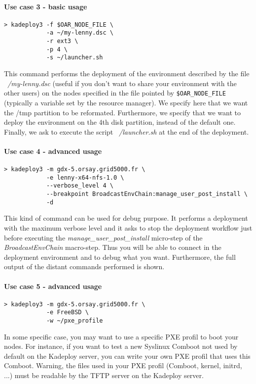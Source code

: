 \documentclass[a4wide,10pt,oneside]{book}
\begin{document}
\paragraph{Use case 3 - basic usage}
\begin{verbatim}
> kadeploy3 -f $OAR_NODE_FILE \
            -a ~/my-lenny.dsc \
            -r ext3 \
            -p 4 \
            -s ~/launcher.sh
\end{verbatim}
This command performs the deployment of the environment described by the file \textit{~/my-lenny.dsc} (useful if you don't want to share your environment with the other users) on the nodes specified in the file pointed by \texttt{\$OAR\_NODE\_FILE} (typically a variable set by the resource manager). We specify here that we want the /tmp partition to be reformated. Furthermore, we specify that we want to deploy the environment on the 4th disk partition, instead of the default one. Finally, we ask to execute the script \textit{~/launcher.sh} at the end of the deployment.

\paragraph{Use case 4 - advanced usage}
\begin{verbatim}
> kadeploy3 -m gdx-5.orsay.grid5000.fr \
            -e lenny-x64-nfs-1.0 \
            --verbose_level 4 \
            --breakpoint BroadcastEnvChain:manage_user_post_install \
            -d
\end{verbatim}
This kind of command can be used for debug purpose. It performs a deployment with the maximum verbose level and it asks to stop the deployment workflow just before executing the \textit{manage\_user\_post\_install} micro-step of the \textit{BroadcastEnvChain} macro-step. Thus you will be able to connect in the deployment environment and to debug what you want. Furthermore, the full output of the distant commands performed is shown.

\paragraph{Use case 5 - advanced usage}
\begin{verbatim}
> kadeploy3 -m gdx-5.orsay.grid5000.fr \
            -e FreeBSD \
            -w ~/pxe_profile
\end{verbatim}
In some specific case, you may want to use a specific PXE profil to boot your nodes. For instance, if you want to test a new Syslinux Comboot not used by default on the Kadeploy server, you can write your own PXE profil that uses this Comboot. Warning, the files used in your PXE profil (Comboot, kernel, initrd, ...) must be readable by the TFTP server on the Kadeploy server.
\end{document}
